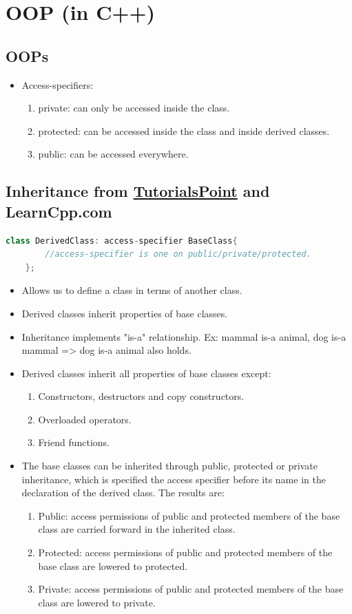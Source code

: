 \documentclass{report}
\begin{document}
\chapter{OOP (in C++)}
\section{OOPs}
\begin{itemize}
    \item Access-specifiers:
    \begin{enumerate}
        \item private: can only be accessed inside the class.
        \item protected: can be accessed inside the class and inside derived classes.
        \item public: can be accessed everywhere.
    \end{enumerate}
\end{itemize}
\section{Inheritance from \href{https://www.tutorialspoint.com/cplusplus/cpp_inheritance.htm}{TutorialsPoint} and LearnCpp.com}
\begin{lstlisting}[language=C++,caption=Syntax]
    class DerivedClass: access-specifier BaseClass{
        //access-specifier is one on public/private/protected.
    };
\end{lstlisting}
\begin{itemize}
    \item Allows us to define a class in terms of another class.
    \item Derived classes inherit properties of base classes.
    \item Inheritance implements "is-a" relationship. Ex: mammal is-a animal, dog is-a mammal => dog is-a animal also holds.
    \item Derived classes inherit all properties of base classes except:
    \begin{enumerate}
        \item Constructors, destructors and copy constructors.
        \item Overloaded operators.
        \item Friend functions.
    \end{enumerate}
    \item The base classes can be inherited through public, 
    protected or private inheritance, which is specified the 
    access specifier before its name in the declaration of the 
    derived class. The results are:
    \begin{enumerate}
        \item Public: access permissions of public and protected members of the base class are carried forward in the inherited class.
        \item Protected: access permissions of public and protected members of the base class are lowered to protected.
        \item Private: access permissions of public and protected members of the base class are lowered to private.
    \end{enumerate}
\end{itemize}
\end{document}
